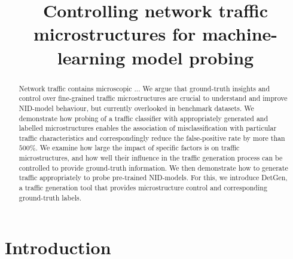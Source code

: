 \documentclass[runningheads]{llncs}
\begin{document}
\title{Controlling network traffic microstructures for machine-learning model probing}
%
%
%
%
%
\maketitle 

\begin{abstract}
Network traffic contains microscopic ...
We argue that ground-truth insights and control over fine-grained traffic microstructures are crucial to understand and improve NID-model behaviour, but currently overlooked in benchmark datasets. We demonstrate how  probing of a traffic classifier with appropriately generated and labelled microstructures enables the association of misclassification with particular traffic characteristics and correspondingly reduce the false-positive rate by more than $500\%$. We examine how large the impact of specific factors is on traffic microstructures, and how well their influence in the traffic generation process can be controlled to provide ground-truth information. We then demonstrate how to generate traffic appropriately to probe pre-trained NID-models. 
For this, we introduce DetGen, a traffic generation tool that provides microstructure control and corresponding ground-truth labels.
\end{abstract}





\section{Introduction}
\end{document}
